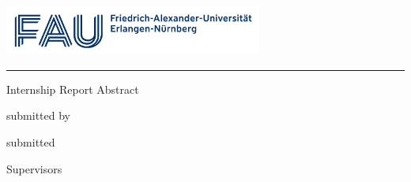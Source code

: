 \begin{titlepage}
\begin{localsize}{11}
\begin{center}
\begin{center}
\vspace*{0.2cm}

\includegraphics[width=8.5cm]{figures/logos/Logo_FAU.pdf}
\end{center}
\vspace{-0.3cm}
\noindent\rule{\textwidth}{1pt}

\vspace{1cm}
{{\Large Internship Report Abstract}}

\vspace{1cm}
{\myTitle}

\vspace{0.5cm}
{\small{submitted by}\\
\vspace{0.2cm}
\Large{\myName}}

\vspace{0.5cm}
{\small{submitted}\\
\vspace{0.2cm}
\Large{\myTime}

\vspace{3.5cm}}

\vspace{0.5cm}
{\small Supervisors}\\
\vspace{0.2cm}
{\Large \mySupervisor\\
\vspace{0.15cm}
\myProf}
\end{center}

\vspace{2cm}


\end{localsize}
\end{titlepage}
